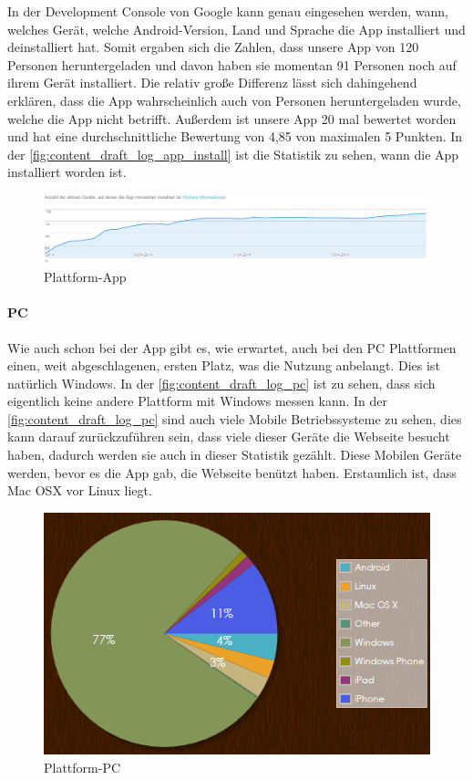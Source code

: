 In der Development Console von Google kann genau eingesehen werden, wann, welches Gerät, welche Android-Version, Land und Sprache die App installiert und deinstalliert hat. Somit ergaben sich die Zahlen, dass unsere App von 120 Personen heruntergeladen und davon haben sie momentan 91 Personen noch auf ihrem Gerät installiert. Die relativ große Differenz lässt sich dahingehend erklären, dass die App wahrscheinlich auch von Personen heruntergeladen wurde, welche die App nicht betrifft. Außerdem ist unsere App 20 mal bewertet worden und hat eine durchschnittliche Bewertung von 4,85 von maximalen 5 Punkten. In der \autoref{fig:content_draft_log_app_install} ist die Statistik zu sehen, wann die App installiert worden ist.

\begin{figure}[H]
\centering
\includegraphics[keepaspectratio=true, width=17cm]{images/screenshots/statistics/app_install.png}
\caption{Plattform-App}
\label{fig:content_draft_log_app_install}
\end{figure}

\paragraph{PC\\}
Wie auch schon bei der App gibt es, wie erwartet, auch bei den PC Plattformen einen, weit abgeschlagenen, ersten Platz, was die Nutzung anbelangt. Dies ist natürlich Windows. In der \autoref{fig:content_draft_log_pc} ist zu sehen, dass sich eigentlich keine andere Plattform mit Windows messen kann. In der \autoref{fig:content_draft_log_pc} sind auch viele Mobile Betriebssysteme zu sehen, dies kann darauf zurückzuführen sein, dass viele dieser Geräte die Webseite besucht haben, dadurch werden sie auch in dieser Statistik gezählt. Diese Mobilen Geräte werden, bevor es die App gab, die Webseite benützt haben. Erstaunlich ist, dass Mac OSX vor Linux liegt.
\begin{figure}[H]
\centering
\includegraphics[keepaspectratio=true, width=12cm]{images/screenshots/statistics/pc_plattform.png}
\caption{Plattform-PC}
\label{fig:content_draft_log_pc}
\end{figure}

